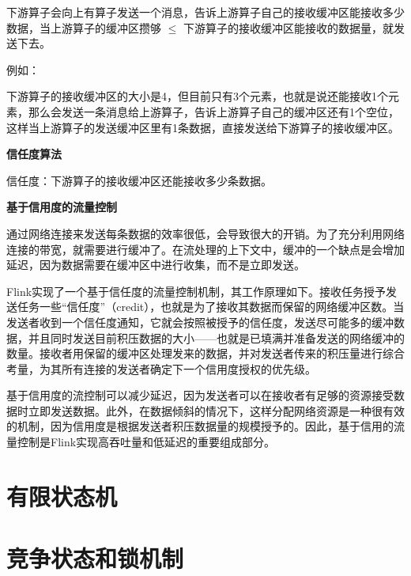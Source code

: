\documentclass[cn,11pt,chinese]{elegantbook}
\begin{document}
下游算子会向上有算子发送一个消息，告诉上游算子自己的接收缓冲区能接收多少数据，当上游算子的缓冲区攒够 $\le$ 下游算子的接收缓冲区能接收的数据量，就发送下去。

例如：

下游算子的接收缓冲区的大小是4，但目前只有3个元素，也就是说还能接收1个元素，那么会发送一条消息给上游算子，告诉上游算子自己的缓冲区还有1个空位，这样当上游算子的发送缓冲区里有1条数据，直接发送给下游算子的接收缓冲区。

\textbf{信任度算法}

信任度：下游算子的接收缓冲区还能接收多少条数据。

\textbf{基于信用度的流量控制}

通过网络连接来发送每条数据的效率很低，会导致很大的开销。为了充分利用网络连接的带宽，就需要进行缓冲了。在流处理的上下文中，缓冲的一个缺点是会增加延迟，因为数据需要在缓冲区中进行收集，而不是立即发送。

Flink实现了一个基于信任度的流量控制机制，其工作原理如下。接收任务授予发送任务一些“信任度”（credit），也就是为了接收其数据而保留的网络缓冲区数。当发送者收到一个信任度通知，它就会按照被授予的信任度，发送尽可能多的缓冲数据，并且同时发送目前积压数据的大小——也就是已填满并准备发送的网络缓冲的数量。接收者用保留的缓冲区处理发来的数据，并对发送者传来的积压量进行综合考量，为其所有连接的发送者确定下一个信用度授权的优先级。

基于信用度的流控制可以减少延迟，因为发送者可以在接收者有足够的资源接受数据时立即发送数据。此外，在数据倾斜的情况下，这样分配网络资源是一种很有效的机制，因为信用度是根据发送者积压数据量的规模授予的。因此，基于信用的流量控制是Flink实现高吞吐量和低延迟的重要组成部分。

\chapter{有限状态机}

\chapter{竞争状态和锁机制}
\end{document}
